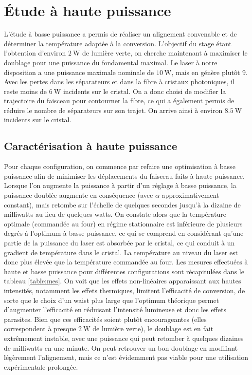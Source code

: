 \documentclass[11pt,a4paper]{article}
\begin{document}
\section{Étude à haute puissance}

L'étude à basse puissance a permis de réaliser un alignement convenable et de déterminer la température adaptée à la conversion. L'objectif du stage étant l'obtention d'environ $\SI{2}{\watt}$ de lumière verte, on cherche maintenant à maximiser le doublage pour une puissance du fondamental maximal. Le laser à notre disposition a une puissance maximale nominale de $\SI{10}{\watt}$, mais en génère plutôt $9$. Avec les pertes dans les séparateurs et dans la fibre à cristaux photoniques, il reste moins de $\SI{6}{\watt}$ incidents sur le cristal. On a donc choisi de modifier la trajectoire du faisceau pour contourner la fibre, ce qui a également permis de réduire le nombre de séparateurs sur son trajet. On arrive ainsi à environ $\SI{8.5}{\watt}$ incidents sur le cristal. 

\subsection{Caractérisation à haute puissance}
Pour chaque configuration, on commence par refaire une optimisation à basse puissance afin de minimiser les déplacements du faisceau faits à haute puissance.
Lorsque l'on augmente la puissance à partir d'un réglage à basse puissance, la puissance doublée augmente en conséquence (avec $\alpha$ approximativement constant), mais retombe sur l'échelle de quelques secondes jusqu'à la dizaine de milliwatts au lieu de quelques watts. On constate alors que la température optimale (commandée au four) en régime stationnaire est inférieure de plusieurs degrés à l'optimum à basse puissance, ce qui se comprend en considérant qu'une partie de la puissance du laser est absorbée par le cristal, ce qui conduit à un gradient de température dans le cristal. La température au niveau du laser est donc plus élevée que la température commandée au four. Les mesures effectuées à haute et basse puissance pour différentes configurations sont récapitulées dans le tableau \ref{table:mes}. On voit que les effets non-linéaires apparaissant aux hautes intensités, notamment les effets thermiques, limitent l'efficacité de conversion, de sorte que le choix d'un waist plus large que l'optimum théorique permet d'augmenter l'efficacité en réduisant l'intensité lumineuse et donc les effets parasites. Bien que ces efficacités soient plutôt encourageantes (elles correspondent à presque $\SI{2}{\watt}$ de lumière verte), le doublage est en fait extrêmement instable, avec une puissance qui peut retomber à quelques dizaines de milliwatts en une minute. On peut retrouver un bon doublage en modifiant légèrement l'alignement, mais ce n'est évidemment pas viable pour une utilisation expérimentale prolongée.
\end{document}
